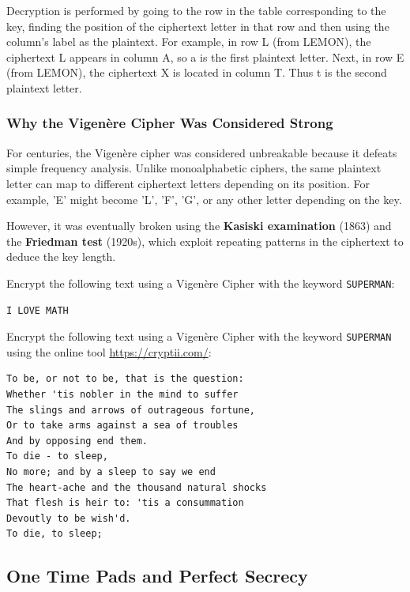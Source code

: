 \documentclass[11pt,a4paper]{report}
\begin{document}
Decryption is performed by going to the row in the table corresponding to the key, finding the position of the ciphertext letter in that row and then using the column's label as the plaintext.
For example, in row L (from LEMON), the ciphertext L appears in column A, so a is the first plaintext letter.
Next, in row E (from LEMON), the ciphertext X is located in column T. Thus t is the second plaintext letter.

\subsubsection{Why the Vigen\`ere Cipher Was Considered Strong}

For centuries, the Vigen\`ere cipher was considered unbreakable because it defeats simple frequency analysis. Unlike monoalphabetic ciphers, the same plaintext letter can map to different ciphertext letters depending on its position. For example, 'E' might become 'L', 'F', 'G', or any other letter depending on the key.

However, it was eventually broken using the \textbf{Kasiski examination} (1863) and the \textbf{Friedman test} (1920s), which exploit repeating patterns in the ciphertext to deduce the key length.

\begin{ex}
Encrypt the following text using a Vigen\`ere Cipher with the keyword \verb|SUPERMAN|:
\begin{verbatim}
I LOVE MATH
\end{verbatim}

\end{ex}

\begin{ex}
Encrypt the following text using a Vigen\`ere Cipher with the keyword \verb|SUPERMAN|
using the online tool \url{https://cryptii.com/}:
\begin{verbatim}
To be, or not to be, that is the question:
Whether 'tis nobler in the mind to suffer
The slings and arrows of outrageous fortune,
Or to take arms against a sea of troubles
And by opposing end them.
To die - to sleep,
No more; and by a sleep to say we end
The heart-ache and the thousand natural shocks
That flesh is heir to: 'tis a consummation
Devoutly to be wish'd.
To die, to sleep;
\end{verbatim}
\end{ex}


\subsection{One Time Pads and Perfect Secrecy}
\end{document}
